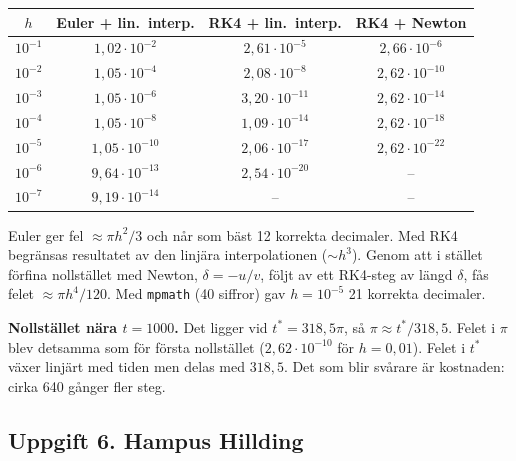 \documentclass{article}
\begin{document}
\begin{center}
\begin{tabular}{c c c c}
\hline
$h$ & Euler + lin.\ interp. & RK4 + lin.\ interp. & RK4 + Newton \\
\hline
$10^{-1}$ & $1{,}02 \cdot 10^{-2}$  & $2{,}61 \cdot 10^{-5}$  & $2{,}66 \cdot 10^{-6}$ \\
$10^{-2}$ & $1{,}05 \cdot 10^{-4}$  & $2{,}08 \cdot 10^{-8}$  & $2{,}62 \cdot 10^{-10}$ \\
$10^{-3}$ & $1{,}05 \cdot 10^{-6}$  & $3{,}20 \cdot 10^{-11}$ & $2{,}62 \cdot 10^{-14}$ \\
$10^{-4}$ & $1{,}05 \cdot 10^{-8}$  & $1{,}09 \cdot 10^{-14}$ & $2{,}62 \cdot 10^{-18}$ \\
$10^{-5}$ & $1{,}05 \cdot 10^{-10}$ & $2{,}06 \cdot 10^{-17}$ & $2{,}62 \cdot 10^{-22}$ \\
$10^{-6}$ & $9{,}64 \cdot 10^{-13}$ & $2{,}54 \cdot 10^{-20}$ & -- \\
$10^{-7}$ & $9{,}19 \cdot 10^{-14}$ & -- & -- \\
\hline
\end{tabular}
\end{center}

Euler ger fel $\approx \pi h^2/3$ och når som bäst 12 korrekta decimaler.
Med RK4 begränsas resultatet av den linjära interpolationen ($\sim h^3$).
Genom att i stället förfina nollstället med Newton,
$\delta = -u/v$, följt av ett RK4-steg av längd $\delta$, fås felet
$\approx \pi h^4/120$. Med \texttt{mpmath} (40 siffror) gav $h = 10^{-5}$
21 korrekta decimaler.

\medskip
\textbf{Nollstället nära $t = 1000$.} Det ligger vid $t^* = 318{,}5\pi$, så
$\pi \approx t^*/318{,}5$. Felet i $\pi$ blev detsamma som för första
nollstället ($2{,}62 \cdot 10^{-10}$ för $h = 0{,}01$). Felet i $t^*$ växer
linjärt med tiden men delas med $318{,}5$. Det som blir svårare är
kostnaden: cirka 640 gånger fler steg.

\subsection*{Uppgift 6. Hampus Hillding}
\end{document}

